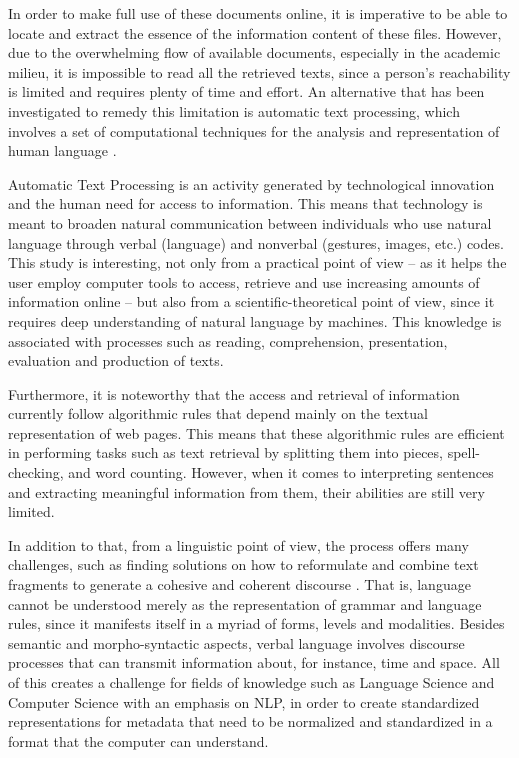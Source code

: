 \documentclass[english]{textolivre}
\begin{document}
In order to make full use of these documents online, it is imperative to be able to locate and extract the essence of the information content of these files. However, due to the overwhelming flow of available documents, especially in the academic milieu, it is impossible to read all the retrieved texts, since a person’s reachability is limited and requires plenty of time and effort. An alternative that has been investigated to remedy this limitation is automatic text processing, which involves a set of computational techniques for the analysis and representation of human language \cite{cambria_jumping_2014}.

Automatic Text Processing is an activity generated by technological innovation and the human need for access to information. This means that technology is meant to broaden natural communication between individuals who use natural language through verbal (language) and nonverbal (gestures, images, etc.) codes. This study is interesting, not only from a practical point of view – as it helps the user employ computer tools to access, retrieve and use increasing amounts of information online – but also from a scientific-theoretical point of view, since it requires deep understanding of natural language by machines. This knowledge is associated with processes such as reading, comprehension, presentation, evaluation and production of texts.

Furthermore, it is noteworthy that the access and retrieval of information currently follow algorithmic rules that depend mainly on the textual representation of web pages. This means that these algorithmic rules are efficient in performing tasks such as text retrieval by splitting them into pieces, spell-checking, and word counting. However, when it comes to interpreting sentences and extracting meaningful information from them, their abilities are still very limited.

In addition to that, from a linguistic point of view, the process offers many challenges, such as finding solutions on how to reformulate and combine text fragments to generate a cohesive and coherent discourse \cite{jones_automatic_2007}. That is, language cannot be understood merely as the representation of grammar and language rules, since it manifests itself in a myriad of forms, levels and modalities. Besides semantic and morpho-syntactic aspects, verbal language involves discourse processes that can transmit information about, for instance, time and space. All of this creates a challenge for fields of knowledge such as Language Science and Computer Science with an emphasis on NLP, in order to create standardized representations for metadata that need to be normalized and standardized in a format that the computer can understand.
\end{document}

